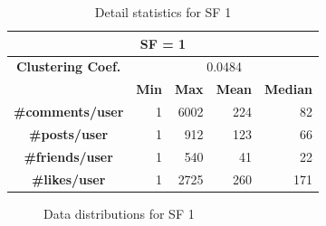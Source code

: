 \begin{table}[H]
        \centering
        \begin{tabular}{|c||r|r|r|r|}
            \hline    \multicolumn{5}{|c|}{SF = 1 }  \\
            \hline   \textbf{Clustering Coef.} &   \multicolumn{4}{|c|}{0.0484} \\
            \hline & \textbf{Min} & \textbf{Max} & \textbf{Mean} & \textbf{Median}   \\
            \hline  \textbf{\#comments/user}  &1 &  6002 & 224 & 82 \\
            \hline  \textbf{\#posts/user}  &1 &  912 & 123 & 66 \\
            \hline  \textbf{\#friends/user}  &1 &  540 & 41 & 22 \\
            \hline  \textbf{\#likes/user}  &1 &  2725 & 260 & 171 \\
            \hline
        \end{tabular}
        \caption{Detail statistics for SF 1}
\end{table}

\begin{figure}[H]
\begin{center}
  \caption{Data distributions for SF 1}
  \label{fig:datadistSF1}
\end{center}
\end{figure}


